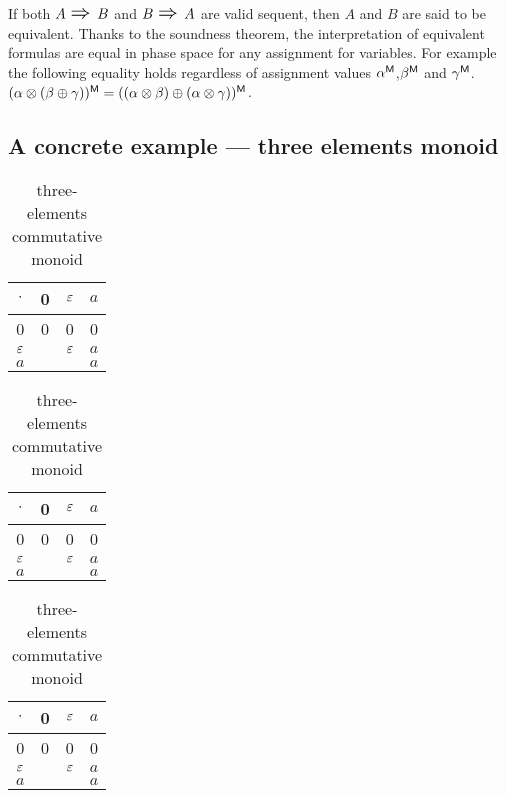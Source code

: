 \begin{remark}
 If  both $A \mbox{ \Large$\Rightarrow$ } B$ and $B \mbox{ \Large$\Rightarrow$ } A$ are valid sequent, then $A$ and $B$ are said to be equivalent. 
Thanks to the soundness theorem,  the interpretation of equivalent formulas are equal in phase space for any assignment for variables. 
For example the following equality holds regardless of assignment values ${\alpha}^{\sf M}$,${\beta}^{\sf M}$ and ${\gamma}^{\sf M}$. 
%
$( \alpha  \otimes (\beta  \oplus \gamma))^{\sf M}
 = ( (\alpha \otimes \beta) \oplus ( \alpha \otimes \gamma))^{\sf M}$. 
\end{remark}






\subsection{A concrete example --- three elements monoid}


\newcommand{\PSt}{\set{0,a,\PSidentity}}
\newcommand{\PSm}{\set{0,\PSidentity}}
\newcommand{\PSf}{\set{0}}

\begin{table}[hbt]
\begin{center}
 \begin{tabular}{c|ccc}
  $\cdot$ & 0 & $\varepsilon$ & $a$ \\ \hline
0 & 0 & 0 & 0 \\
$\varepsilon$ &  & $\varepsilon$ & $a$ \\
$a$ & & & $a$ \\
  \end{tabular}
\hskip 36pt\begin{tabular}{c|ccc}
  $\cdot$ & 0 & $\varepsilon$ & $a$ \\ \hline
0 & 0 & 0 & 0 \\
$\varepsilon$ &  & $\varepsilon$ & $a$ \\
$a$ & & & $a$ \\
  \end{tabular}
\hskip 36pt\begin{tabular}{c|ccc}
  $\cdot$ & 0 & $\varepsilon$ & $a$ \\ \hline
0 & 0 & 0 & 0 \\
$\varepsilon$ &  & $\varepsilon$ & $a$ \\
$a$ & & & $a$ \\
\end{tabular}
\end{center}
\caption{three-elements commutative monoid}
\label{table:mult3}
\end{table}

